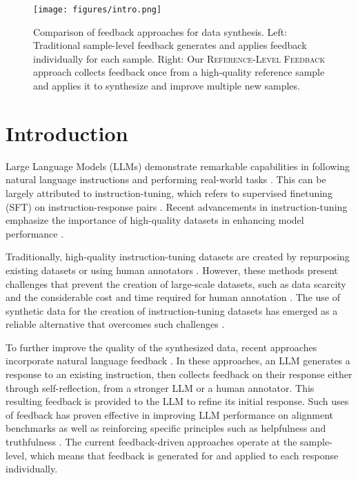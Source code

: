 \begin{figure}[t]
    \centering
    \texttt{[image: figures/intro.png]} \hfill

    \caption{Comparison of feedback approaches for data synthesis. Left: Traditional sample-level feedback generates and applies feedback individually for each sample. Right: Our \textsc{Reference-Level Feedback} approach collects feedback once from a high-quality reference sample and applies it to synthesize and improve multiple new samples.
    }
    \label{fig:intro}
\end{figure}

\section{Introduction}

Large Language Models (LLMs) demonstrate remarkable capabilities in following natural language instructions and performing real-world tasks \citep{openai2024openaio1card, dubey2024llama3herdmodels}. This can be largely attributed to instruction-tuning, which refers to supervised finetuning (SFT) on instruction-response pairs \citep{wei2022finetunedlanguagemodelszeroshot, bai2022traininghelpfulharmlessassistant, NEURIPS2022_b1efde53}. Recent advancements in instruction-tuning emphasize the importance of high-quality datasets in enhancing model performance \citep{chen2024alpagasus, lima}.

Traditionally, high-quality instruction-tuning datasets are created by repurposing existing datasets or using human annotators \citep{wei2022finetunedlanguagemodelszeroshot, wang-etal-2022-super, NEURIPS2022_b1efde53,lima,chen-etal-2024-minprompt}. However, these methods present challenges that prevent the creation of large-scale datasets, such as data scarcity and the considerable cost and time required for human annotation \citep{liu2024bestpracticeslessonslearned, long-etal-2024-llms, singh2024humandatascalingselftraining}. The use of synthetic data for the creation of instruction-tuning datasets has emerged as a reliable alternative that overcomes such challenges \citep{wang-etal-2023-self-instruct, alpaca, xu2023wizardlmempoweringlargelanguage, peng2023instructiontuninggpt4}. 

To further improve the quality of the synthesized data, recent approaches incorporate natural language feedback \citep{chen2024iteralign,chen2024learning, sun2024principle, bai2022constitutionalaiharmlessnessai}. In these approaches, an LLM generates a response to an existing instruction, then collects feedback on their response either through self-reflection, from a stronger LLM or a human annotator. This resulting feedback is provided to the LLM to refine its initial response. Such uses of feedback has proven effective in improving LLM performance on alignment benchmarks as well as reinforcing specific principles such as helpfulness and truthfulness \citep{chen2024learning, sun2024principle, bai2022constitutionalaiharmlessnessai}. The current feedback-driven approaches operate at the sample-level, which means that feedback is generated for and applied to each response individually.


